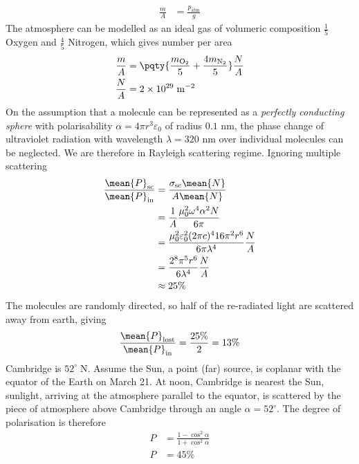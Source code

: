\documentclass[12pt]{extarticle}
\begin{document}
\begin{outline}
\begin{align*}
            \frac{m}{A} &= \frac{p_\text{atm}}{g} 
        \end{align*}
        The atmosphere can be modelled as an ideal gas of volumeric composition \(\frac{1}{5}\) Oxygen and \(\frac{4}{5}\) Nitrogen, which gives number per area \begin{align*}
            \frac{m}{A} &= \pqty{\frac{m_{\mathrm{O}_2}}{5} +\frac{4m_{\mathrm{N}_2}}{5}}\frac{N}{A}\\
            \frac{N}{A} &= 2 \times 10^{29} \; \mathrm{m^{ - 2}}
        \end{align*}
        On the assumption that a molecule can be represented as a \emph{perfectly conducting sphere} with polarisability \(\alpha = 4\pi r^3\varepsilon_0\) of radius \(0.1\) nm, the phase change of ultraviolet radiation with wavelength \(\lambda = 320\) nm over individual molecules can be neglected. We are therefore in Rayleigh scattering regime. Ignoring multiple scattering \begin{align*}
            \frac{\mean{P}_\text{sc}}{\mean{P}_\text{in}} &= \frac{\sigma_\text{sc} \mean{N}}{A \mean{N}} \\
            &= \frac{1}{A}\frac{\mu_0^2 \omega^4 \alpha^2 N}{6\pi} \\
            &= \frac{\mu_0^2 \varepsilon_0^2 (2\pi c)^4 16\pi^2 r^6 }{6\pi \lambda^4} \frac{N}{A}\\
            &= \frac{ 2^8 \pi^5 r^6 }{6 \lambda^4} \frac{N}{A}\\
            & \approx  25\%
        \end{align*}
        The molecules are randomly directed, so half of the re-radiated light are scattered away from earth, giving \[
            \frac{\mean{P}_\text{lost}}{\mean{P}_\text{in}}= \frac{25\%}{2}=13\%
        \]
        \1 Cambridge is \(52^\circ \; \mathrm{N}\). Assume the Sun, a point (far) source, is coplanar with the equator of the Earth on March 21. At noon, Cambridge is nearest the Sun, sunlight, arriving at the atmosphere parallel to the equator, is scattered by the piece of atmosphere above Cambridge through an angle \(\alpha =52^\circ\). The degree of polarisation is therefore \begin{align*}
            P &= \frac{1 - \cos^2\alpha}{1 + \cos^2\alpha} \\
            P &= 45\%
        \end{align*}
    \end{outline}
\end{document}
